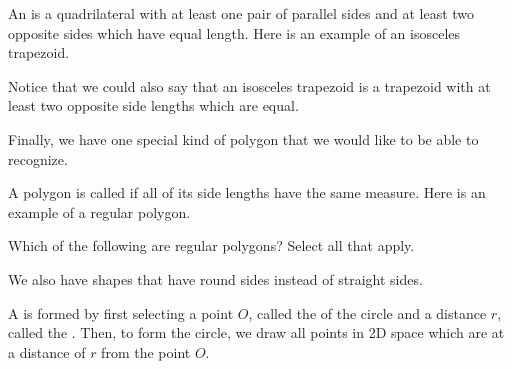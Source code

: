 \documentclass{ximera}
\begin{document}
\begin{definition}
	An  is a quadrilateral with at least one pair of parallel sides and at least two opposite sides which have equal length. Here is an example of an isosceles trapezoid.
	\begin{center}
	\end{center}
\end{definition}
Notice that we could also say that an isosceles trapezoid is a trapezoid with at least two opposite side lengths which are equal.





Finally, we have one special kind of polygon that we would like to be able to recognize.
\begin{definition}
	A polygon is called  if all of its side lengths have the same measure. Here is an example of a regular polygon.
	\begin{center}
	\end{center}
\end{definition}

\begin{question}
Which of the following are regular polygons? Select all that apply.
\begin{selectAll}
\end{selectAll}
\end{question}

We also have shapes that have round sides instead of straight sides.
\begin{definition}
A  is formed by first selecting a point $O$, called the  of the circle and a distance $r$, called the . Then, to form the circle, we draw all points in 2D space which are at a distance of $r$ from the point $O$.
\end{definition}
\end{document}
